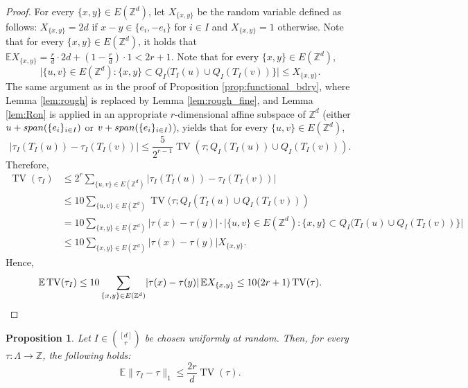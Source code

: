 \documentclass[11pt, reqno]{amsart}
\newtheorem{proposition}[theorem]{Proposition}
\newcommand{\Z}{\mathbb{Z}}
\DeclareMathOperator{\TV}{TV}
\numberwithin{equation}{section}
\begin{document}
\begin{proof}
For every $\{x,y\}\in E(\Z^d)$, let $X_{\{x,y\}}$ be the random variable defined as follows: 
$X_{\{x,y\}}=2d$ if $x-y\in\{e_i,-e_i\}$ for $i\in I$ and $X_{\{x,y\}}=1$ otherwise. 
Note that for every $\{x,y\}\in E(\Z^d)$, it holds that ${\mathbb E}X_{\{x,y\}}=\frac{r}{d}\cdot 2d+\left(1-\frac{r}{d}\right)\cdot 1<2r+1$.
Note that for every $\{x,y\}\in E(\Z^d)$, 
$$\lvert \{u,v\}\in E(\Z^d)\colon  \{x,y\}\subset Q_I(T_I(u)\cup Q_I(T_I(v))\}\rvert\leq X_{\{x,y\}}.$$
The same argument as in the proof of Proposition \ref{prop:functional_bdry}, where Lemma \ref{lem:rough} is replaced by Lemma \ref{lem:rough_fine}, and Lemma \ref{lem:Ron} is applied in an appropriate $r$-dimensional affine subspace of ${\mathbb Z}^d$ (either $u+{\rm span}(\{e_i\}_{i\in I})$ or $v+{\rm span}(\{e_i\}_{i\in I})$), yields that for every $\{u,v\}\in E(\Z^d)$, 
\begin{equation*}
\left\lvert\tau_I(T_I(u))-\tau_I(T_I(v))\right\rvert
\leq\frac{5}{2^{r-1}}\TV\left(\tau; Q_I(T_I(u))\cup Q_I(T_I(v))\right).
\end{equation*}
Therefore, 
\begin{align*}
\TV(\tau_I)&\leq
2^r\sum_{\{u,v\}\in E(\Z^d)}\left\lvert\tau_I(T_I(u))-\tau_I(T_I(v))\right\rvert\\
&\leq 10\sum_{\{u,v\}\in E(\Z^d)}
\TV(\tau;Q_I(T_I(u)\cup Q_I(T_I(v)))\\
&=10\sum_{\{x,y\}\in E(\Z^d)}\lvert \tau(x)-\tau(y)\rvert\cdot\lvert \{u,v\}\in E(\Z^d)\colon  \{x,y\}\subset Q_I(T_I(u)\cup Q_I(T_I(v))\}\rvert\\
&\leq10\sum_{\{x,y\}\in E(\Z^d)}\lvert \tau(x)-\tau(y)\rvert X_{\{x,y\}}.
\end{align*}
Hence,
\begin{equation*}
\mathbb{E}\TV(\tau_I)\leq 10\sum_{\{x,y\}\in E(\Z^d)}\lvert \tau(x)-\tau(y)\rvert\, \mathbb{E}X_{\{x,y\}}\leq 10(2r+1)\TV(\tau).\qedhere
\end{equation*}
\end{proof}

\begin{proposition}\label{prop:functional_diff_fine}
Let $I\in\binom{[d]}{r}$ be chosen uniformly at random. Then, for every $\tau\colon \Lambda \to \Z$, the following holds:
$$
{\mathbb E}\lVert \tau_I-\tau\rVert_1\leq \frac{2r}{d}\TV(\tau). 
$$
\end{proposition}
\end{document}
